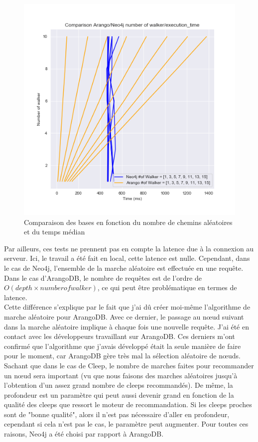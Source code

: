 \documentclass{article} %
\begin{document}
\begin{figure}[!h]
 \centering
 \includegraphics[keepaspectratio = true,scale=0.7]{comparison_nbWalker_time.png}
 \caption{Comparaison des bases en fonction du nombre de chemins aléatoires et du temps médian}
 \label{fig:walker}
\end{figure}

Par ailleurs, ces tests ne prennent pas en compte la latence due à la connexion au serveur. Ici, le travail a été fait en local, cette latence est nulle. Cependant, dans le cas de Neo4j, l’ensemble de la marche aléatoire est effectuée en une requête. Dans le cas d’ArangoDB, le nombre de requêtes est de l’ordre de $O(depth\times number of walker)$, ce qui peut être problématique en termes de latence.\\
Cette différence s'explique par le fait que j'ai dû créer moi-même l'algorithme de marche aléatoire pour ArangoDB. Avec ce dernier, le passage au nœud suivant dans la marche aléatoire implique à chaque fois une nouvelle requête.  J'ai été en contact avec les développeurs travaillant sur ArangoDB. Ces derniers m'ont confirmé que l'algorithme que j'avais développé était la seule manière de faire pour le moment, car ArangoDB gère très mal la sélection aléatoire de nœuds.\\

Sachant que dans le cas de Cleep, le nombre de marches faites pour recommander un nœud sera important (vu que nous faisons des marches aléatoires jusqu'à l'obtention d'un assez grand nombre de cleeps recommandés). De même, la profondeur est un paramètre qui peut aussi devenir grand en fonction de la qualité des cleeps que ressort le moteur de recommandation. Si les cleeps proches sont de "bonne qualité", alors il n'est pas nécessaire d'aller en profondeur, cependant si cela n'est pas le cas, le paramètre peut augmenter. Pour toutes ces raisons, Neo4j a été choisi par rapport à ArangoDB.
\end{document}
